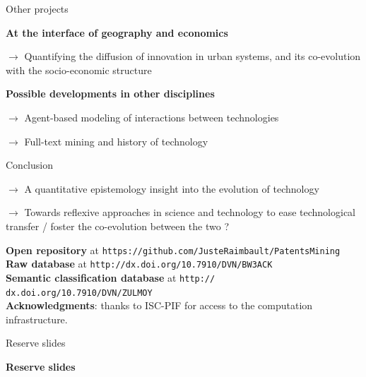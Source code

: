 \documentclass{beamer}
\begin{document}
\begin{frame}{Other projects}
    \justify
     
     \textbf{At the interface of geography and economics}
     
     \smallskip
     
     $\rightarrow$ Quantifying the diffusion of innovation in urban systems, and its co-evolution with the socio-economic structure
     
     \smallskip
     
     \bigskip
     
     \textbf{Possible developments in other disciplines}
     
      \smallskip
     
     $\rightarrow$ Agent-based modeling of interactions between technologies
     
     \smallskip
     
     $\rightarrow$ Full-text mining and history of technology \\

\end{frame}

\begin{frame}{Conclusion}

$\rightarrow$ A quantitative epistemology insight into the evolution of technology

\medskip

$\rightarrow$ Towards reflexive approaches in science and technology to ease technological transfer / foster the co-evolution between the two ?


\bigskip
\bigskip

\textbf{Open repository} at \texttt{https://github.com/JusteRaimbault/PatentsMining}\\\medskip
\textbf{Raw database} at \texttt{http://dx.doi.org/10.7910/DVN/BW3ACK}\\\medskip 
\textbf{Semantic classification database} at  \texttt{http:// dx.doi.org/10.7910/DVN/ZULMOY}\\\medskip
\textbf{Acknowledgments}: thanks to ISC-PIF for access to the computation infrastructure.

\end{frame}


\begin{frame}{Reserve slides}
    
    \centering
    \Huge
    \textbf{Reserve slides}
    
\end{frame}
\end{document}
